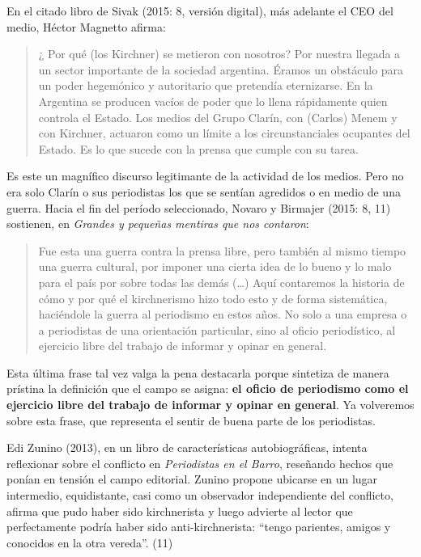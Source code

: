 {En el citado libro de Sivak (2015: 8, versión digital), más adelante el CEO del medio, Héctor Magnetto afirma:

\begin{quote}
¿ Por qué (los Kirchner) se metieron con nosotros? Por nuestra llegada a un sector importante de la sociedad argentina. Éramos un obstáculo para un poder hegemónico y autoritario que pretendía eternizarse. En la Argentina se producen vacíos de poder que lo llena rápidamente quien controla el Estado. Los medios del Grupo Clarín, con (Carlos) Menem y con Kirchner, actuaron como un límite a los circunstanciales ocupantes del Estado. Es lo que sucede con la prensa que cumple con su tarea.
\end{quote}

Es este un magnífico discurso legitimante de la actividad de los medios. Pero no era solo Clarín o sus periodistas los que se sentían agredidos o en medio de una guerra. Hacia el fin del período seleccionado, Novaro y Birmajer (2015: 8, 11) sostienen, en \emph{Grandes y pequeñas mentiras que nos contaron}:

\begin{quote}
Fue esta una guerra contra la prensa libre, pero también al mismo tiempo una guerra cultural, por imponer una cierta idea de lo bueno y lo malo para el país por sobre todas las demás (\ldots) Aquí contaremos la historia de cómo y por qué el kirchnerismo hizo todo esto y de forma sistemática, haciéndole la guerra al periodismo en estos años. No solo a una empresa o a periodistas de una orientación particular, sino al oficio periodístico, al ejercicio libre del trabajo de informar y opinar en general.
\end{quote}

Esta última frase tal vez valga la pena destacarla porque sintetiza de manera prístina la definición que el campo se asigna: \textbf{el oficio de periodismo como el ejercicio libre del trabajo de informar y opinar en general}. Ya volveremos sobre esta frase, que representa el sentir de buena parte de los periodistas.

Edi Zunino (2013), en un libro de características autobiográficas, intenta reflexionar sobre el conflicto en \emph{Periodistas en el Barro}, reseñando hechos que ponían en tensión el campo editorial. Zunino propone ubicarse en un lugar intermedio, equidistante, casi como un observador independiente del conflicto, afirma que pudo haber sido kirchnerista y luego advierte al lector que perfectamente podría haber sido anti-kirchnerista: ``tengo parientes, amigos y conocidos en la otra vereda''. (11)

}
